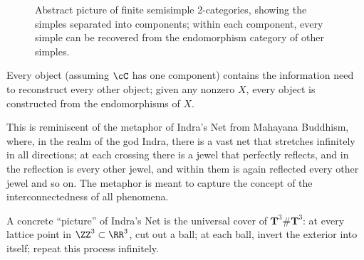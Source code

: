 \documentclass[12pt]{article}
\newcommand{\amod}[1]{{#1\textrm{-mod}}}
\begin{document}
\begin{figure}
\centering
{}
\caption{Abstract picture of finite semisimple 2-categories,
showing the simples separated into components;
within each component,
every simple can be recovered from the endomorphism category
of other simples.
}
\end{figure}


\begin{remark}
Every object (assuming $\cC$ has one component)
contains the information need to reconstruct every other object;
given any nonzero $X$,
every object is constructed from the endomorphisms of $X$.

This is reminiscent of the metaphor of
Indra's Net from Mahayana Buddhism,
where, in the realm of the god Indra,
there is a vast net that stretches infinitely in all directions;
at each crossing there is a jewel that perfectly reflects,
and in the reflection is every other jewel,
and within them is again reflected every other jewel and so on.
The metaphor is meant to capture the concept of the
interconnectedness of all phenomena.

A concrete ``picture'' of Indra's Net is the universal cover
of $\mathbf{T}^3 \# \mathbf{T}^3$:
at every lattice point in $\ZZ^3 \subset \RR^3$,
cut out a ball;
at each ball, invert the exterior into itself;
repeat this process infinitely.
\end{remark}
\end{document}
